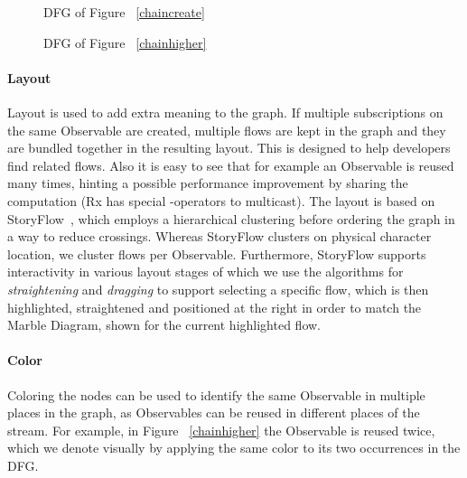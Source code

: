 \begin{figure}[ht]
    \centering
    
    \caption{DFG of Figure~%
    \ref{chaincreate}}%
    \label{fiddlesimple}
\end{figure}

\begin{figure}[ht]
    \centering
    
    \caption{DFG of Figure~%
    \ref{chainhigher}}%
    \label{fiddlehigher}
\end{figure}

\paragraph{Layout} Layout is used to add extra meaning to the graph.  If
multiple subscriptions on the same Observable are created, multiple
flows are kept in the graph and they are bundled together in the
resulting layout.  This is designed to help developers find related
flows.  Also it is easy to see that for example an Observable is reused
many times, hinting a possible performance improvement by sharing the
computation (Rx has special -operators to multicast).  The
layout is based on StoryFlow~\cite{liu2013storyflow}, which employs a
hierarchical clustering before ordering the graph in a way to reduce
crossings.  Whereas StoryFlow clusters on physical character location,
we cluster flows per Observable.  Furthermore, StoryFlow supports
interactivity in various layout stages of which we use the algorithms
for \emph{straightening} and \emph{dragging} to support selecting a
specific flow, which is then highlighted, straightened and positioned at
the right in order to match the Marble Diagram, shown for the current
highlighted flow.

\paragraph{Color} Coloring the nodes can be used to identify the same
Observable in multiple places in the graph, as Observables can be reused
in different places of the stream.  For example, in Figure~%
\ref{chainhigher} the  Observable is reused twice, which we
denote visually by applying the same color to its two occurrences in the
DFG.

